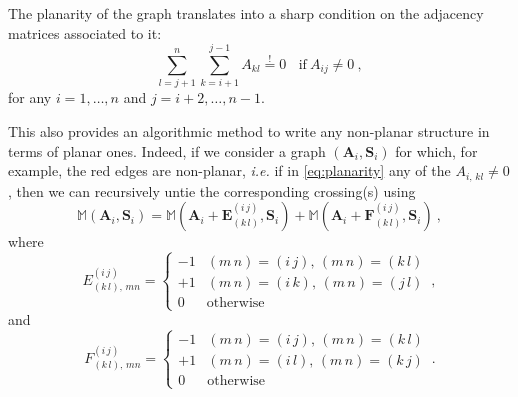 \documentclass[aps,prd,nofootinbib,twocolumn,10pt]{revtex4-2}
\begin{document}
The planarity of the graph translates into a sharp condition on the adjacency matrices associated to it:
\begin{equation}
	\label{eq:planarity}
	\sum_{l=j+1}^n \sum_{k=i+1}^{j-1} A_{k l} \overset{!}{=} 0 \ \ \ \ \mathrm{if} \ A_{i j} \neq 0\ ,
\end{equation}
for any $i=1,\dots , n$ and $j= i+2,\dots ,n-1$.

This also provides an algorithmic method to write any non-planar structure in terms of planar ones. Indeed, if we consider a graph $(\mathbf{A}_i,\mathbf{S}_i)$ for which, for example, the red edges are non-planar, \textit{i.e.} if in \eqref{eq:planarity} any of the $A_{i,\,k l} \neq 0$, then we can recursively untie the corresponding crossing(s) using
\begin{equation}
	\mathbb{M}(\mathbf{A}_i,\mathbf{S}_i) = \mathbb{M}(\mathbf{A}_i+\mathbf{E}^{(i\,j)}_{(k\,l)},\mathbf{S}_i) + \mathbb{M}(\mathbf{A}_i+\mathbf{F}^{(i\,j)}_{(k\,l)},\mathbf{S}_i)\ ,
\end{equation}
where
\begin{equation}
		E^{(i\,j)}_{(k\,l),\, m n} = 
		\begin{cases}
			- 1 & (m\, n) = (i\, j),\, (m\, n) = (k\, l)\\
			+1 & (m\, n) = (i\, k),\, (m\, n) = (j\, l)\\
			0 & \mathrm{otherwise}
		\end{cases}\, ,
\end{equation}
and
\begin{equation}
		F^{(i\,j)}_{(k\,l),\, m n} = 
		\begin{cases}
			- 1 & (m\, n) = (i\, j),\, (m\, n) = (k\, l)\\
			+1 & (m\, n) = (i\, l),\, (m\, n) = (k\, j)\\
			0 & \mathrm{otherwise}
		\end{cases}\, .
\end{equation}
\end{document}
